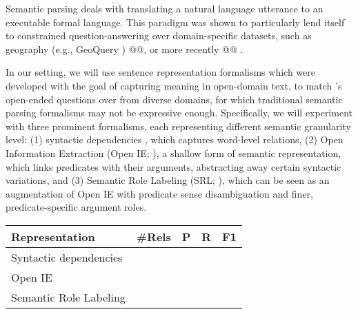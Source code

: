 
Semantic parsing \cite{semantic-parsing}
deals with translating a natural language utterance to
an executable formal language.
This paradigm was shown to particularly lend itself to constrained question-answering
over domain-specific datasets, such as geography (e.g., GeoQuery \cite{geoquery})
@@, or more recently @@ .

In our setting, we will use sentence representation formalisms which were
developed with the goal of capturing meaning in open-domain text, to match \drop's
open-ended questions over from diverse domains,
for which traditional semantic parsing formalisms may not be expressive enough.
Specifically, we will experiment with three prominent formalisms, each
representing different semantic granularity level:
(1) syntactic dependencies \cite{sd}, which captures word-level relations, 
(2) Open Information Extraction (Open IE; \cite{oie}), a shallow
form of semantic representation, which links predicates
with their arguments, abstracting away certain syntactic variations, and
(3) Semantic Role Labeling (SRL; \cite{srl}), which can be seen as an
augmentation of Open IE with predicate sense disambiguation and finer, predicate-specific
argument roles.


\begin{table}[]
\begin{tabular}{@{}lllll@{}}
\toprule
Representation         & \#Rels & P & R & F1 \\ \midrule
Syntactic dependencies &             &           &        &    \\
Open IE                &             &           &        &    \\
Semantic Role Labeling  &             &           &        &    \\ \bottomrule
\end{tabular}
\end{table}

